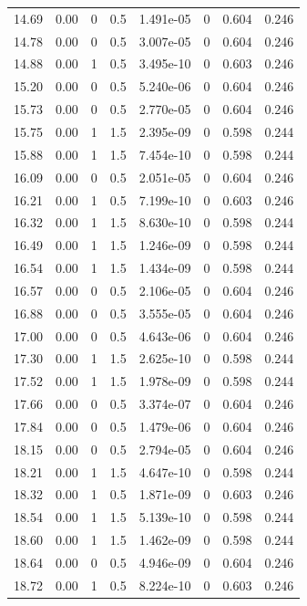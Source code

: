 \documentclass[preview]{standalone}
\begin{document}
{{{\begin{tabular}{L{1.2cm}C{1.2cm} C{0.3cm}C{0.5cm} C{1.4cm}C{1.4cm} C{1.4cm}C{1.4cm}}
  14.69  &  0.00  & 0     & 0.5 &  1.491e-05  & 0  & 0.604 &  0.246   \\ 
  14.78  &  0.00  & 0     & 0.5 &  3.007e-05  & 0  & 0.604 &  0.246   \\ 
  14.88  &  0.00  & 1     & 0.5 &  3.495e-10  & 0  & 0.603 &  0.246   \\ 
  15.20  &  0.00  & 0     & 0.5 &  5.240e-06  & 0  & 0.604 &  0.246   \\ 
  15.73  &  0.00  & 0     & 0.5 &  2.770e-05  & 0  & 0.604 &  0.246   \\ 
  15.75  &  0.00  & 1     & 1.5 &  2.395e-09  & 0  & 0.598 &  0.244   \\ 
  15.88  &  0.00  & 1     & 1.5 &  7.454e-10  & 0  & 0.598 &  0.244   \\ 
  16.09  &  0.00  & 0     & 0.5 &  2.051e-05  & 0  & 0.604 &  0.246   \\ 
  16.21  &  0.00  & 1     & 0.5 &  7.199e-10  & 0  & 0.603 &  0.246   \\ 
  16.32  &  0.00  & 1     & 1.5 &  8.630e-10  & 0  & 0.598 &  0.244   \\ 
  16.49  &  0.00  & 1     & 1.5 &  1.246e-09  & 0  & 0.598 &  0.244   \\ 
  16.54  &  0.00  & 1     & 1.5 &  1.434e-09  & 0  & 0.598 &  0.244   \\ 
  16.57  &  0.00  & 0     & 0.5 &  2.106e-05  & 0  & 0.604 &  0.246   \\ 
  16.88  &  0.00  & 0     & 0.5 &  3.555e-05  & 0  & 0.604 &  0.246   \\ 
  17.00  &  0.00  & 0     & 0.5 &  4.643e-06  & 0  & 0.604 &  0.246   \\ 
  17.30  &  0.00  & 1     & 1.5 &  2.625e-10  & 0  & 0.598 &  0.244   \\ 
  17.52  &  0.00  & 1     & 1.5 &  1.978e-09  & 0  & 0.598 &  0.244   \\ 
  17.66  &  0.00  & 0     & 0.5 &  3.374e-07  & 0  & 0.604 &  0.246   \\ 
  17.84  &  0.00  & 0     & 0.5 &  1.479e-06  & 0  & 0.604 &  0.246   \\ 
  18.15  &  0.00  & 0     & 0.5 &  2.794e-05  & 0  & 0.604 &  0.246   \\ 
  18.21  &  0.00  & 1     & 1.5 &  4.647e-10  & 0  & 0.598 &  0.244   \\ 
  18.32  &  0.00  & 1     & 0.5 &  1.871e-09  & 0  & 0.603 &  0.246   \\ 
  18.54  &  0.00  & 1     & 1.5 &  5.139e-10  & 0  & 0.598 &  0.244   \\ 
  18.60  &  0.00  & 1     & 1.5 &  1.462e-09  & 0  & 0.598 &  0.244   \\ 
  18.64  &  0.00  & 0     & 0.5 &  4.946e-09  & 0  & 0.604 &  0.246   \\ 
  18.72  &  0.00  & 1     & 0.5 &  8.224e-10  & 0  & 0.603 &  0.246   \\ 
\hline 
\end{tabular} 

}}}
\end{document}
